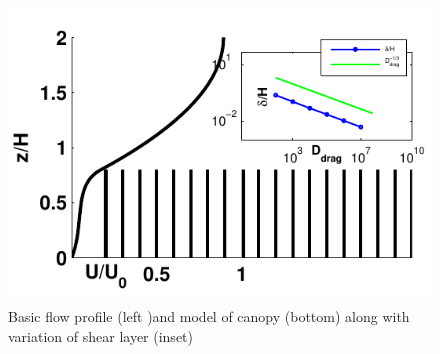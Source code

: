 \documentclass[aps,prl,twocolumn,showpacs,superscriptaddress,groupedaddress,10pt]{revtex4-1}  %
\begin{document}
\begin{figure}[htb]
  \includegraphics[scale=0.8]{fig1}
\caption{Basic flow profile (left )and model of canopy (bottom) along with variation of shear layer (inset) }
\end{figure}
\end{document}
